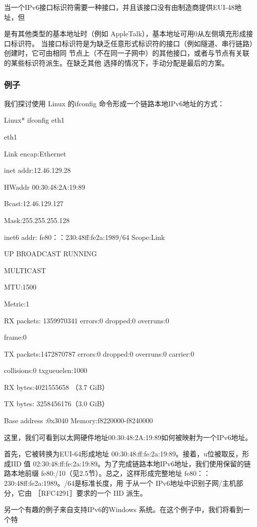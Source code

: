 当一个IPv6接口标识符需要一种接口，并且该接口没有由制造商提供EUI-48地址，但

是有其他类型的基本地址时（例如 AppleTalk），基本地址可用0从左侧填充形成接口标识符。
当接口标识符是为缺乏任意形式标识符的接口（例如隧道、串行链路）创建时，它可由相同
节点上（不在同一子网中）的其他接口，或者与节点有关联的某些标识符派生。在缺乏其他
选择的情况下，手动分配是最后的方案。

\subsubsection{例子}
我们探讨使用 Linux 的ifconfig 命令形成一个链路本地IPv6地址的方式：

Linux* ifconfig eth1

eth1

Link encap:Ethernet

inet addr:12.46.129.28

HWaddr 00:30:48:2A:19:89

Bcast:12.46.129.127

Mask:255.255.255.128

inet6 addr: fe80：：230:48ff:fe2a:1989/64 Scope:Link

UP BROADCAST RUNNING

MULTICAST

MTU:1500

Metric:1

RX packets: 1359970341 errors:0 dropped:0 overruns:0

frame:0

TX packets:1472870787 errors:0 dropped:0 overruns:0 carrier:0

collisions:0 txgueuelen:1000

RX bytes:4021555658 （3.7 GiB）

TX bytes: 3258456176（3.0 GiB）

Base address :0x3040 Memory:f8220000-f8240000

这里，我们可看到以太网硬件地址00:30:48:2A:19:89如何被映射为一个IPv6地址。

首先，它被转换为EUI-64形成地址 00:30:48:ff:fe:2a:19:89。接着，u位被取反，形成IID
值 02:30:48:ff:fe:2a:19:89。为了完成链路本地IPv6地址，我们使用保留的链路本地前缀
fe80:/10（见2.5节）。总之，这样形成完整地址 fe80：：230:48ff:fe2a:1989。/64是标准长度，用
于从一个 IPv6地址中识别子网/主机部分，它由 ［RFC4291］要求的一个 IID 派生。

另一个有趣的例子来自支持IPv6的Windows 系统。在这个例子中，我们将看到一个特

